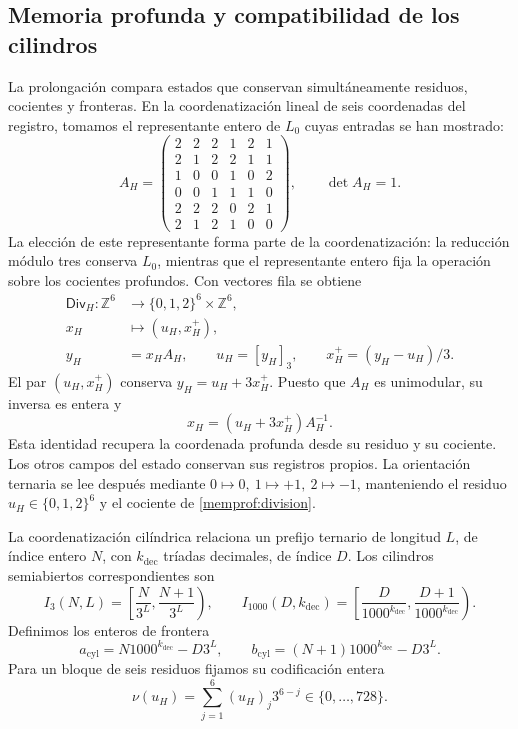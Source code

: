 \subsection{Memoria profunda y compatibilidad de los cilindros}
\label{memprof:seccion}

La prolongación compara estados que conservan simultáneamente residuos,
cocientes y fronteras. En la coordenatización lineal de seis coordenadas del registro,
tomamos el representante entero de \(L_0\) cuyas entradas se han mostrado:
\[
 A_H=\begin{pmatrix}
 2&2&2&1&2&1\\2&1&2&2&1&1\\1&0&0&1&0&2\\
 0&0&1&1&1&0\\2&2&2&0&2&1\\2&1&2&1&0&0
 \end{pmatrix},\qquad\det A_H=1.
\]
La elección de este representante forma parte de la coordenatización: la reducción
módulo tres conserva \(L_0\), mientras que el representante entero fija
la operación sobre los cocientes profundos. Con vectores fila se obtiene
\begin{equation}
 \begin{aligned}
 \mathsf{Div}_H:\mathbb Z^6&\longrightarrow
       \{0,1,2\}^6\times\mathbb Z^6,\\
 x_H&\longmapsto(u_H,x_H^+),\\
 y_H&=x_HA_H,\qquad u_H=[y_H]_3,\qquad
 x_H^+=(y_H-u_H)/3 .
 \end{aligned}
 \label{memprof:division}
\end{equation}
El par \((u_H,x_H^+)\) conserva \(y_H=u_H+3x_H^+\). Puesto que
\(A_H\) es unimodular, su inversa es entera y
\begin{equation}
 x_H=(u_H+3x_H^+)A_H^{-1}.
 \label{memprof:inversa}
\end{equation}
Esta identidad recupera la coordenada profunda desde su residuo y su
cociente. Los otros campos del estado conservan sus registros propios.
La orientación ternaria se lee después mediante
\(0\mapsto0,\ 1\mapsto+1,\ 2\mapsto-1\), manteniendo el residuo
\(u_H\in\{0,1,2\}^6\) y el cociente de \eqref{memprof:division}.

La coordenatización cilíndrica relaciona un prefijo ternario de longitud \(L\), de
índice entero \(N\), con \(k_{\mathrm{dec}}\) tríadas decimales, de
índice \(D\). Los cilindros semiabiertos correspondientes son
\[
 I_3(N,L)=\left[\frac N{3^L},\frac{N+1}{3^L}\right),\qquad
 I_{1000}(D,k_{\mathrm{dec}})
 =\left[\frac D{1000^{k_{\mathrm{dec}}}},
         \frac{D+1}{1000^{k_{\mathrm{dec}}}}\right).
\]
Definimos los enteros de frontera
\[
 a_{\mathrm{cyl}}=N1000^{k_{\mathrm{dec}}}-D3^L,\qquad
 b_{\mathrm{cyl}}=(N+1)1000^{k_{\mathrm{dec}}}-D3^L.
\]
Para un bloque de seis residuos fijamos su codificación entera
\[
 \nu(u_H)=\sum_{j=1}^6(u_H)_j3^{6-j}
 \in\{0,\ldots,728\}.
\]


